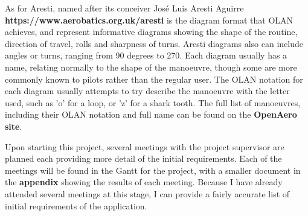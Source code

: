 As for Aresti, named after its conceiver José Luis Aresti Aguirre \textbf{https://www.aerobatics.org.uk/aresti} is the diagram format that OLAN achieves, and represent informative diagrams showing the shape of the routine, direction of travel, rolls and sharpness of turns. Aresti diagrams also can include angles or turns, ranging from 90 degrees to 270. Each diagram usually has a name, relating normally to the shape of the manoeuvre, though some are more commonly known to pilots rather than the regular user. The OLAN notation for each diagram usually attempts to try describe the manoeuvre with the letter used, such as 'o' for a loop, or 'z' for a shark tooth. The full list of manoeuvres, including their OLAN notation and full name can be found on the \textbf{OpenAero site}.

Upon starting this project, several meetings with the project supervisor are planned each providing more detail of the initial requirements. Each of the meetings will be found in the Gantt for the project, with a smaller document in the\textbf{ appendix} showing the results of each meeting. Because I have already attended several meetings at this stage, I can provide a fairly accurate list of initial requirements of the application.\\


